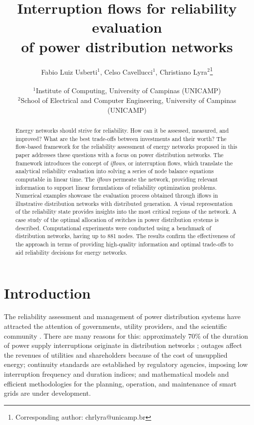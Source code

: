 \documentclass{article}
\title{Interruption flows for reliability evaluation \\ of power distribution networks}
\author{Fabio Luiz Usberti$^1$, Celso Cavellucci$^1$, Christiano Lyra$^2$\footnote{Corresponding author: chrlyra@unicamp.br} \\ \\ $^1$Institute of Computing, University of Campinas (UNICAMP) \\ $^2$School of Electrical and Computer Engineering, University of Campinas (UNICAMP) \\ }
\begin{document}
\maketitle

\begin{abstract}
Energy
networks should strive for reliability. How can it be assessed, measured, and improved? What are the best trade-offs between investments and their worth? The flow-based framework for the reliability assessment of energy networks 
proposed in this paper addresses these questions with a focus on 
power distribution networks. 
The framework introduces the concept of \textit{iflows}, or interruption flows, which translate the analytical reliability evaluation into solving a series of node balance equations computable in linear time.
The \textit{iflows} permeate the network, providing relevant information to support linear formulations of reliability optimization problems.
Numerical examples showcase the evaluation process obtained through iflows in illustrative distribution networks with distributed generation. A visual representation of the reliability state provides insights into the most critical regions of the network. 
A case study of the optimal allocation of switches in power distribution systems is described. Computational experiments were conducted using a benchmark of distribution networks, having up to 881 nodes. The results confirm the effectiveness of the approach in terms of providing high-quality information and optimal trade-offs to aid reliability decisions for 
energy networks.
\end{abstract}

\section{Introduction} \label{sec:introduction}


The reliability assessment and management of power distribution systems have attracted the attention of governments, utility providers, and the scientific community 
\cite{EscaleraProdanovicCastronuovoRoldanPerez2020}.
There are many reasons for this: approximately $70\%$ of the duration of power supply interruptions originate in distribution networks \cite{billinton}; outages affect the revenues of utilities and shareholders because of the cost of unsupplied energy; continuity standards are established by regulatory agencies, imposing low interruption frequency and duration indices; and mathematical models and efficient methodologies for the planning, operation, and maintenance of smart grids are under development.
\end{document}
